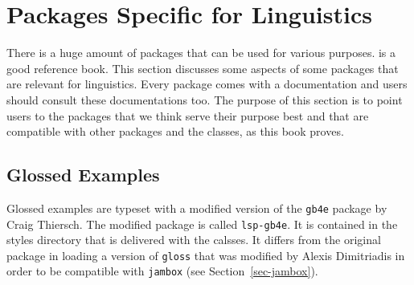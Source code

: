 %



\section{Packages Specific for Linguistics}

There is a huge amount of packages that can be used for various purposes.  is a good
reference book. This section discusses some aspects of some packages that are relevant for
linguistics. Every \latex package comes with a documentation and users should consult these
documentations too. The purpose of this section is to point users to the packages that we think
serve their purpose best and that are compatible with other packages and the \lsp classes, as this
book proves.

\subsection{Glossed Examples}

Glossed examples are typeset with a modified version of the \texttt{gb4e} package by Craig
Thiersch. The modified package is called \texttt{lsp-gb4e}. It is contained in the styles directory
that is delivered with the \lsp \latex calsses. It differs from the original package in loading a
version of \texttt{gloss} that was modified by Alexis Dimitriadis in order to be compatible with
\texttt{jambox} (see Section~\ref{sec-jambox}).

